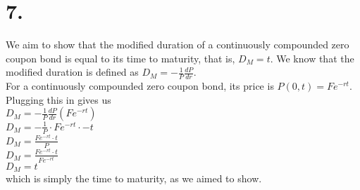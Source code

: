 \documentclass{article}
\begin{document}
\section*{7.}
{\Large 

We aim to show that the modified duration of a continuously compounded zero coupon bond is equal to its time to maturity, that is, $D_M = t$. We know that the modified duration is defined as $D_M = -\frac{1}{P}\frac{dP}{dr} $. \\
For a continuously compounded zero coupon bond, its price is $P(0, t) = Fe^{-rt}$. Plugging this in gives us \\ 
$D_M = -\frac{1}{P}\frac{dP}{dr} (Fe^{-rt})$ \\
$D_M = -\frac{1}{P} \cdot Fe^{-rt} \cdot -t$ \\
$D_M = \frac{Fe^{-rt} \cdot t}{P}$ \\
$D_M = \frac{Fe^{-rt} \cdot t}{Fe^{-rt}}$ \\
$D_M = t$ \\
which is simply the time to maturity, as we aimed to show.

}
\end{document}
